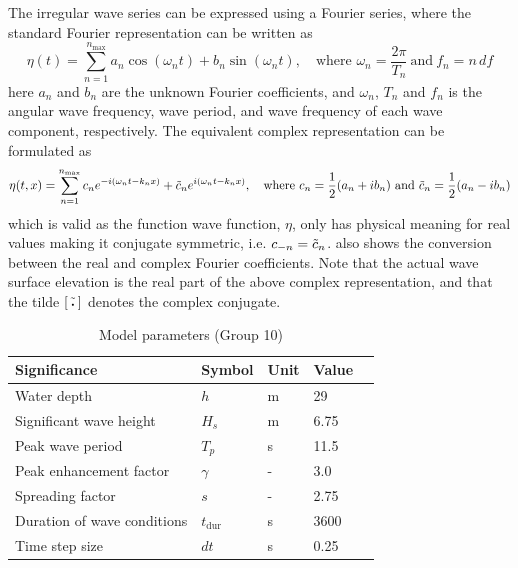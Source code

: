 The irregular wave series can be expressed using a Fourier series, where the standard Fourier representation can be written as
\begin{equation}
    \eta(t) = \sum_{n=1}^{n_{\text{max}}} a_n \cos{(\omega_n t)} +b_n \sin{(\omega_n t)}, \quad \text{where }\omega_n=\frac{2\pi}{T_n} \  \text{and} \ f_n=n\,df
\end{equation}
here $a_n$ and $b_n$ are the unknown Fourier coefficients, and $\omega_n$, $T_n$ and $f_n$ is the angular wave frequency, wave period, and wave frequency of each wave component, respectively. The equivalent complex representation can be formulated as
\begin{equation}
    \eta(t,x) = \sum_{n=1}^{n_{\text{max}}} c_n e^{-i(\omega_n t-k_n x)} + \Tilde{c}_n e^{i(\omega_n t - k_n x)}, \quad \text{where }c_n=\frac{1}{2}(a_n+i b_n) \ \text{and} \ \Tilde{c}_n=\frac{1}{2}(a_n-i b_n)
    \label{eq:ComplexFourier}
\end{equation}
which is valid as the function wave function, $\eta$, only has physical meaning for real values making it conjugate symmetric, i.e. $c_{-n}=\Tilde{c}_n$.  also shows the conversion between the real and complex Fourier coefficients. Note that the actual wave surface elevation is the real part of the above complex representation, and that the tilde $[\, \Tilde{\text{\scalebox{0.5}{\textbullet}}}\,]$ denotes the complex conjugate.
\begin{table}[h]
    \centering
    \caption{Model parameters (Group 10)}
    \begin{tabular}{@{}lllll@{}}
    \toprule
    Significance                            &   Symbol          & Unit       & Value \\ \hline
    Water depth                             &   $h$             & \si{m}     & 29   \\
    Significant wave height                 &   $H_{s}$         & \si{m}     & 6.75   \\
    Peak wave period                        &   $T_p$           & \si{s}     & 11.5  \\ \addlinespace[1mm]
    Peak enhancement factor                 &   $\gamma$        & \si{-}     & 3.0 \\ \addlinespace[1mm]
    Spreading factor                        &   $s$             & \si{-}     & 2.75   \\ \addlinespace[1mm]
    Duration of wave conditions             &   $t_{\text{dur}}$& \si{s}     & 3600   \\
    Time step size                          &   $dt$            & \si{s}     & 0.25   \\
    \bottomrule
    \end{tabular}
    \label{tab:Modelparameters}
\end{table}

